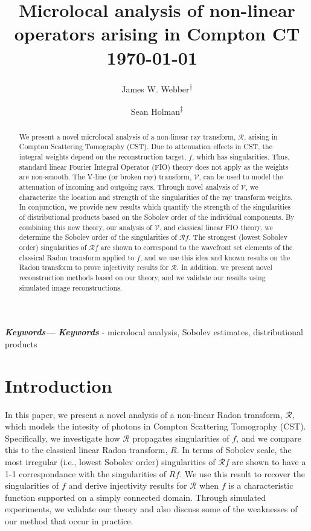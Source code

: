 \documentclass[a4paper,12pt]{amsart}
\title[short]{Microlocal analysis of non-linear operators arising in Compton CT\\{\footnotesize\ddmmyyyydate\today~\currenttime}}
\author{James W. Webber\textsuperscript{$\dagger$}}
\author{Sean Holman\textsuperscript{$\ddagger$}}
\numberwithin{equation}{section}
\theoremstyle{plain}
\numberwithin{theorem}{section}
\theoremstyle{definition}
\theoremstyle{remark}
\theoremstyle{remark}
\theoremstyle{remark}
\providecommand{\keywords}[1]
{
  \small	
  \textbf{\textit{Keywords---}} #1
}
\begin{document}
\begin{abstract}
We present a novel microlocal analysis of a non-linear ray transform, $\mathcal{R}$, arising in Compton Scattering Tomography (CST). Due to attenuation effects in CST, the integral weights depend on the reconstruction target, $f$, which has singularities. Thus, standard linear Fourier Integral Operator (FIO) theory does not apply as the weights are non-smooth. The V-line (or broken ray) transform, $\mathcal{V}$, can be used to model the attenuation of incoming and outgoing rays. Through novel analysis of $\mathcal{V}$, we characterize the location and strength of the singularities of the ray transform weights. In conjunction, we provide new results which quantify the strength of the singularities of distributional products based on the Sobolev order of the individual components. By combining this new theory, our analysis of $\mathcal{V}$, and classical linear FIO theory, we determine the Sobolev order of the singularities of $\mathcal{R}f$. The strongest (lowest Sobolev order) singularities of $\mathcal{R}f$ are shown to correspond to the wavefront set elements of the classical Radon transform applied to $f$, and we use this idea and known results on the Radon transform to prove injectivity results for $\mathcal{R}$. In addition, we present novel reconstruction methods based on our theory, and we validate our results using simulated image reconstructions.
\end{abstract}
\maketitle

\keywords{{\it{\textbf{Keywords}}}} - microlocal analysis, Sobolev estimates, distributional products

\section{Introduction}
In this paper, we present a novel analysis of a non-linear Radon transform, $\mathcal{R}$, which models the intesity of photons in Compton Scattering Tomography (CST). Specifically, we investigate how $\mathcal{R}$ propagates singularities of $f$, and we compare this to the classical linear Radon transform, $R$. In terms of Sobolev scale, the most irregular (i.e., lowest Sobolev order) singularities of $\mathcal{R}f$ are shown to have a 1-1 correspondance with the singularities of $Rf$. We use this result to recover the singularities of $f$ and derive injectivity results for $\mathcal{R}$ when $f$ is a characteristic function supported on a simply connected domain. Through simulated experiments, we validate our theory and also discuss some of the weaknesses of our method that occur in practice.
\end{document}
